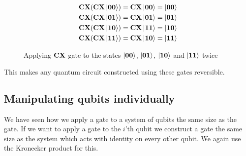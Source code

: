 \begin{figure}[H]
    \centering
    \begin{align*}
        \mathbf{CX}(\mathbf{CX}\ket{\mathbf{0}\mathbf{0}})&=\mathbf{CX}\ket{\mathbf{0}\mathbf{0}}=\ket{\mathbf{0}\mathbf{0}} \\        
        \mathbf{CX}(\mathbf{CX}\ket{\mathbf{0}\mathbf{1}})&=\mathbf{CX}\ket{\mathbf{0}\mathbf{1}}=\ket{\mathbf{0}\mathbf{1}} \\
        \mathbf{CX}(\mathbf{CX}\ket{\mathbf{1}\mathbf{0}})&=\mathbf{CX}\ket{\mathbf{1}\mathbf{1}}=\ket{\mathbf{1}\mathbf{0}}\\
        \mathbf{CX}(\mathbf{CX}\ket{\mathbf{1}\mathbf{1}})&=\mathbf{CX}\ket{\mathbf{1}\mathbf{0}}=\ket{\mathbf{1}\mathbf{1}}
    \end{align*}
    \caption{Applying $\mathbf{CX}$ gate to the states $\ket{\mathbf{0}\mathbf{0}}$, $\ket{\mathbf{0}\mathbf{1}}$, $\ket{\mathbf{1}\mathbf{0}}$ and $\ket{\mathbf{1}\mathbf{1}}$ twice}
    \label{fig:cx2}
\end{figure}
\noindent
This makes any quantum circuit constructed using these gates reversible.

\subsection{Manipulating qubits individually}
We have seen how we apply a gate to a system of qubits the same size as the gate. 
If we want to apply a gate to the $i$'th qubit we construct a gate the same size as the system 
which acts with identity on every other qubit. We again use the Kronecker product for this. 

